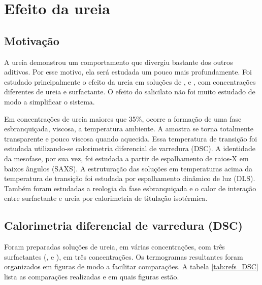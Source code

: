 \chapter{Efeito da ureia}
\label{sec:cap_efeito_ureia}
\section{Motivação}
A ureia demonstrou um comportamento que divergiu bastante dos outros aditivos. Por esse motivo, ela será estudada um pouco mais profundamente. Foi estudado principalmente o efeito da ureia em soluções de \CTAB{}, \TTAB{} e \DTAB, com concentrações diferentes de ureia e surfactante. O efeito do salicilato não foi muito estudado de modo a simplificar o sistema.


Em concentrações de ureia maiores que 35\%, ocorre a formação de uma fase esbranquiçada, viscosa, a temperatura ambiente. A amostra se torna totalmente transparente e pouco viscosa quando aquecida. Essa temperatura de transição foi estudada utilizando-se calorimetria diferencial de varredura (DSC). A identidade da mesofase, por sua vez, foi estudada a partir de espalhamento de raios-X em baixos ângulos (SAXS). A estruturação das soluções em temperaturas acima da temperatura de transição foi estudada por espalhamento dinâmico de luz (DLS). Também foram estudadas a reologia da fase esbranquiçada e o calor de interação entre surfactante e ureia por calorimetria de titulação isotérmica.

\section{Calorimetria diferencial de varredura (DSC)}

	Foram preparadas soluções de ureia, em várias concentrações, com três surfactantes (\CTAB, \TTAB{} e \DTAB), em três concentrações. Os termogramas resultantes foram organizados em figuras de modo a facilitar comparações. A tabela \ref{tab:refs_DSC} lista as comparações realizadas e em quais figuras estão.
    
